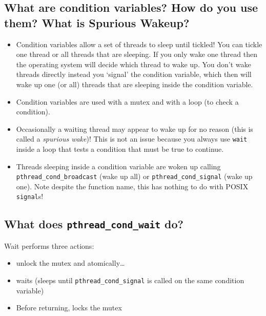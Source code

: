 \subsection{What are condition variables? How do you use them? What is
Spurious
Wakeup?}\label{what-are-condition-variables-how-do-you-use-them-what-is-spurious-wakeup}

\begin{itemize}
\item
  Condition variables allow a set of threads to sleep until tickled! You
  can tickle one thread or all threads that are sleeping. If you only
  wake one thread then the operating system will decide which thread to
  wake up. You don't wake threads directly instead you `signal' the
  condition variable, which then will wake up one (or all) threads that
  are sleeping inside the condition variable.
\item
  Condition variables are used with a mutex and with a loop (to check a
  condition).
\item
  Occasionally a waiting thread may appear to wake up for no reason
  (this is called a \emph{spurious wake})! This is not an issue because
  you always use \texttt{wait} inside a loop that tests a condition that
  must be true to continue.
\item
  Threads sleeping inside a condition variable are woken up calling
  \texttt{pthread\_cond\_broadcast} (wake up all) or
  \texttt{pthread\_cond\_signal} (wake up one). Note despite the
  function name, this has nothing to do with POSIX \texttt{signal}s!
\end{itemize}

\subsection{\texorpdfstring{What does \texttt{pthread\_cond\_wait}
do?}{What does pthread\_cond\_wait do?}}\label{what-does-pthreadux5fcondux5fwait-do}

Wait performs three actions:

\begin{itemize}
\itemsep1pt\parskip0pt
\item
  unlock the mutex and atomically\ldots{}
\item
  waits (sleeps until \texttt{pthread\_cond\_signal} is called on the
  same condition variable)
\item
  Before returning, locks the mutex
\end{itemize}

